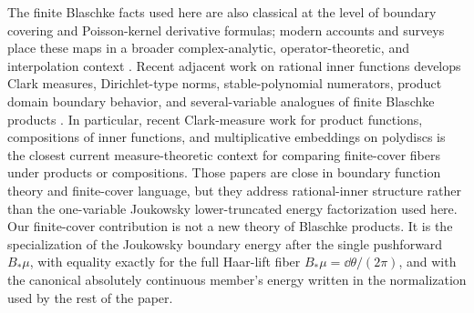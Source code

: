 The finite Blaschke facts used here are also classical at the level of
boundary covering and Poisson-kernel derivative formulas; modern
accounts and surveys place these maps in a broader complex-analytic,
operator-theoretic, and interpolation context
\citep{Colwell1985,GarciaMashreghiRoss2017,GarciaMashreghiRoss2018}.
Recent adjacent work on rational inner functions develops Clark
measures, Dirichlet-type norms, stable-polynomial numerators, product
domain boundary behavior, and several-variable analogues of finite
Blaschke products
\citep{FelderLe2022,BickelCimaSola2023,Bergqvist2023,AndersonBergqvistBickelCimaSola2024,Jacobsson2024ClarkProduct,Knese2024RationalInnerSurvey,BickelKnesePascoeSola2025}.
In particular, recent Clark-measure work for product functions,
compositions of inner functions, and multiplicative embeddings on
polydiscs \citep{Jacobsson2024ClarkProduct} is the closest current
measure-theoretic context for comparing finite-cover fibers under
products or compositions.
Those papers are close in boundary function theory and finite-cover
language, but they address rational-inner structure rather than the
one-variable Joukowsky lower-truncated energy factorization used here.  Our
finite-cover contribution is not a new theory of Blaschke products. It
is the specialization of the Joukowsky boundary energy after the
single pushforward \(B_\ast\mu\), with equality exactly for the full
Haar-lift fiber \(B_\ast\mu=\dd\theta/(2\pi)\), and with the canonical
absolutely continuous member's energy written in the normalization used by
the rest of the paper.

